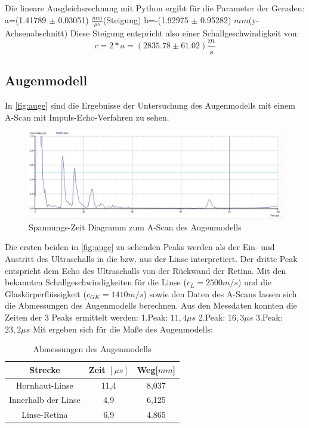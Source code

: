 Die lineare Ausgleichsrechnung mit Python ergibt für die Parameter der Geraden:\newline
a=(1.41789 $\pm$ 0.03051) $\frac{mm}{\mu s}$(Steigung)\newline
b=-(1.92975 $\pm$ 0.95282) $mm$(y-Achsenabschnitt)\newline
Diese Steigung entspricht also einer Schallgeschwindigkeit von:
\begin{equation*}
  c=2*a= (2835.78 \pm 61.02) \frac{m}{s}
\end{equation*} 
  
\subsection{Augenmodell}
In \autoref{fig:auge} sind die Ergebnisse der Untersuchung des Augenmodells mit einem A-Scan mit Impuls-Echo-Verfahren zu sehen.
\begin{figure}[H]
  \centering
  \includegraphics[width=\textwidth]{messungen/auge/auge.jpg}
  \caption{Spannungs-Zeit Diagramm zum A-Scan des Augenmodells}
  \label{fig:auge}
\end{figure}

Die ersten beiden in \autoref{fig:auge} zu sehenden Peaks werden als der Ein- und Austritt des Ultraschalls in die bzw. aus der Linse interpretiert. Der dritte Peak entspricht dem Echo des Ultraschalls von der Rückwand der Retina. Mit den bekannten Schallgeschwindigkeiten für die Linse ($c_{L} = 2500 m/s$) und die Glaskörperflüssigkeit ($c_{GK} = 1410 m/s$) sowie den Daten des A-Scans lassen sich die Abmessungen des Augenmodells berechnen. Aus den Messdaten konnten die Zeiten der 3 Peaks ermittelt werden:\newline
1.Peak: $11,4 \mu s$ \newline 2.Peak: $16,3 \mu s$ \newline 3.Peak: $23,2 \mu s$ \newline
Mit ergeben sich für die Maße des Augenmodells:
\begin{table}
  \centering
  \caption{Abmessungen des Augenmodells}
\label{tab:mess2}
  \begin{tabular}{c c c}
  \toprule
  Strecke & Zeit $[\mu s]$ & Weg[$mm$]\\
  \midrule
  Hornhaut-Linse & 11,4 & 8,037 \\
  Innerhalb der Linse & 4,9 & 6,125\\
  Linse-Retina & 6,9 & 4.865\\
  \bottomrule
  \end{tabular}
  \end{table}